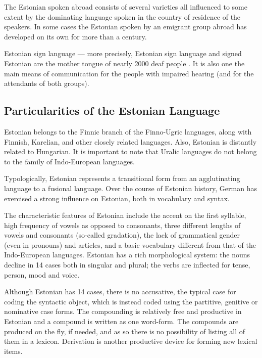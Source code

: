 \begin{multicols}{2}
The Estonian spoken abroad consists of several varieties all influenced to some extent by the dominating language spoken in the country of residence of the speakers. 
In some cases the Estonian spoken by an emigrant group abroad has developed on its own for more than a century.

Estonian sign language --- more precisely, Estonian sign language and signed Estonian are the mother tongue of nearly 2000 deaf people \cite{Sign}. 
It is also one the main means of communication for the people with impaired hearing (and for the attendants of both groups).

\subsection{Particularities of the Estonian Language}

Estonian belongs to the Finnic branch of the Finno-Ugric languages, along with Finnish, Karelian, and other closely related languages. 
Also, Estonian is distantly related to Hungarian. 
It is important to note that Uralic languages do not belong to the family of Indo-European languages.

Typologically, Estonian represents a transitional form from an agglutinating language to a fusional language. 
Over the course of Estonian history, German has exercised a strong influence on Estonian, both in vocabulary and syntax. 

The characteristic features of Estonian include the accent on the first syllable, high frequency of vowels as opposed to consonants, three different lengths of vowels and consonants (so-called gradation), the lack of grammatical gender (even in pronouns) and articles, and a basic vocabulary different from that of the Indo-European languages. 
Estonian has a rich morphological system: the nouns decline in 14
cases both in singular and plural; the verbs are inflected for tense,
person, mood and voice.


Although Estonian has 14 cases, there is no accusative, the typical case for coding the syntactic object, which is instead coded using the partitive, genitive or nominative case forms.
The compounding is relatively free and productive in Estonian and a compound is written as one word-form. 
The compounds are produced on the fly, if needed, and as so there is no possibility of listing all of them in a lexicon. 
Derivation is another productive device for forming new lexical items.




\end{multicols}
